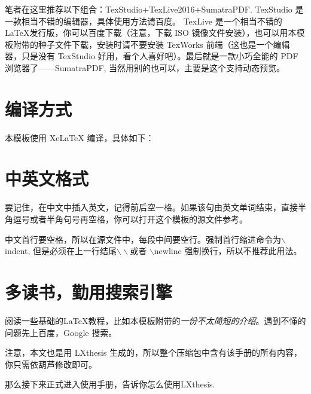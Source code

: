 笔者在这里推荐以下组合：TexStudio+TexLive2016+SumatraPDF. TexStudio 是一款相当不错的编辑器，具体使用方法请百度。 TexLive 是一个相当不错的 \LaTeX 发行版，你可以百度下载（注意，下载 ISO 镜像文件安装），也可以用本模板附带的种子文件下载，安装时请不要安装 TexWorks 前端（这也是一个编辑器，只是没有 TexStudio 好用，看个人喜好吧）。最后就是一款小巧全能的 PDF 浏览器了——SumatraPDF, 当然用别的也可以，主要是这个支持动态预览。

\section{编译方式}
本模板使用 XeLaTeX 编译，具体如下：

\section{中英文格式}
要记住，在中文中插入英文，记得前后空一格。如果该句由英文单词结束，直接半角逗号或者半角句号再空格，你可以打开这个模板的源文件参考。

中文首行要空格，所以在源文件中，每段中间要空行。强制首行缩进命令为$\backslash$indent, 但是必须在上一行结尾$\backslash\backslash$或者 $\backslash$newline 强制换行，所以不推荐此用法。

\section{多读书，勤用搜索引擎}
阅读一些基础的\LaTeX 教程，比如本模板附带的\emph{一份不太简短的\LaTeXe 介绍}。遇到不懂的问题先上百度，Google 搜索。

注意，本文也是用 LXthesis 生成的，所以整个压缩包中含有该手册的所有内容，你只需依葫芦修改即可。

那么接下来正式进入使用手册，告诉你怎么使用LXthesis. 